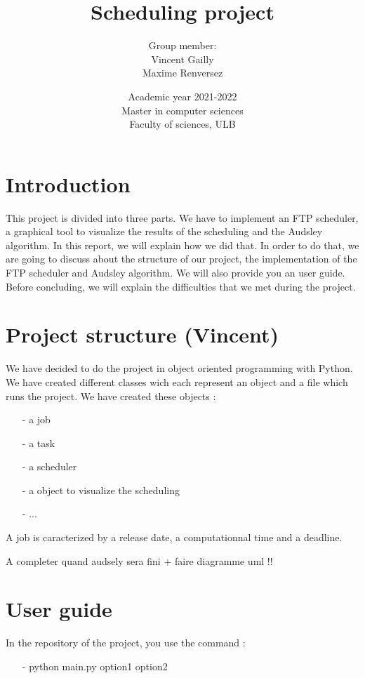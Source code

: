 \documentclass[a4paper,12pt]{article}
\title{
{\Huge Scheduling project}\\
\smallskip
}
\author{
Group member:\\
Vincent Gailly\\
Maxime Renversez
\smallskip
}
\date{ Academic year 2021-2022\\
Master in computer sciences \\
\vspace{1cm}
Faculty of sciences, ULB}
\begin{document}
\maketitle
\newpage
\tableofcontents
\newpage

\section{Introduction}

This project is divided into three parts. We have to implement an FTP scheduler, a graphical tool to visualize the results of the scheduling and the Audsley algorithm. In this report, we will explain how we did that. In order to do that, we are going to discuss about the structure of our project, the implementation of the FTP scheduler and Audsley algorithm. We will also provide you an user guide. Before concluding, we will explain the difficulties that we met during the project.      

\newpage

\section{Project structure (Vincent)}

We have decided to do the project in object oriented programming with Python. We have created different classes wich each represent an object and a file which runs the project. We have created these objects : \\
\begin{itemize}
\item[-] a job 
\item[-] a task 
\item[-] a scheduler 
\item[-] a object  to visualize the scheduling 
\item[-] ...
\end{itemize}

\smallskip
\noindent
A job is caracterized by a release date, a computationnal time and a deadline. 

\smallskip 
A completer quand audsely sera fini  + faire diagramme uml !! 

\newpage

\section{User guide}

In the repository of the project, you use the command : \\
\begin{itemize}
\item[-] python main.py option1 option2
\end{itemize}
\end{document}
